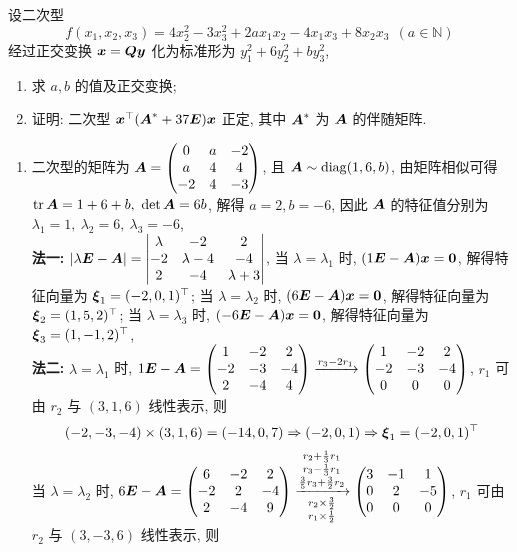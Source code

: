 \begin{example}
    设二次型 $$f(x_1,x_2,x_3)=4x_2^2-3x_3^2+2ax_1x_2-4x_1x_3+8x_2x_3~~(a\in\mathbb{N})$$
    经过正交变换 $\vb*{x}=\vb*{Qy}$ 化为标准形为 $y_1^2+6y_2^2+by_3^2$, 
    \begin{enumerate}[label=(\arabic{*})]
        \item 求 $a,b$ 的值及正交变换;
        \item 证明: 二次型 $\vb*{x}^\top\qty(\vb*{A}^*+37\vb*{E})\vb*{x}$ 正定, 其中 $\vb*{A}^*$ 为 $\vb*{A}$ 的伴随矩阵.
    \end{enumerate}
\end{example}
\begin{solution}
    \begin{enumerate}[label=(\arabic{*})]
        \item 二次型的矩阵为 $\vb*{A}=\mqty(0&a&-2\\a&4&4\\-2&4&-3)$, 且 $\vb*{A}\sim\mathrm{diag}(1,6,b)$, 由矩阵相似可得 $\tr\vb*{A}=1+6+b,~\det\vb*{A}=6b$, 解得 $a=2,b=-6$, 因此 $\vb*{A}$ 的特征值分别为 $\lambda_1=1,~\lambda_2=6,~\lambda_3=-6$, \\
              \textbf{法一: }$|\lambda\vb*{E}-\vb*{A}|=\mqty|\lambda&-2&2\\-2&\lambda-4&-4\\2&-4&\lambda+3|$, 当 $\lambda=\lambda_1$ 时, $\qty(1\vb*{E}-\vb*{A})\vb*{x}=\vb*{0}$, 解得特征向量为 $\vb*{\xi}_1=(-2,0,1)^\top$; 当 $\lambda=\lambda_2$ 时, 
              $(6\vb*{E}-\vb*{A})\vb*{x}=\vb*{0}$, 解得特征向量为 $\vb*{\xi}_2=(1,5,2)^\top$; 当 $\lambda=\lambda_3$ 时, $(-6\vb*{E}-\vb*{A})\vb*{x}=\vb*{0}$, 解得特征向量为 $\vb*{\xi}_3=(1,-1,2)^\top$, \\
              \textbf{法二: }$\lambda=\lambda_1$ 时, $1\vb*{E}-\vb*{A}=\mqty(1&-2&2\\-2&-3&-4\\2&-4&4)\xrightarrow{r_3-2r_1}\mqty(1&-2&2\\-2&-3&-4\\0&0&0)$, $r_1$ 可由 $r_2$ 与 $(3,1,6)$ 线性表示, 
              则 $$(-2,-3,-4)\times(3,1,6)=(-14,0,7)\Rightarrow (-2,0,1)\Rightarrow \vb*{\xi}_1=(-2,0,1)^\top$$
              当 $\lambda=\lambda_2$ 时, $6\vb*{E}-\vb*{A}=\mqty(6&-2&2\\-2&2&-4\\2&-4&9)\xrightarrow[\substack{r_2\times\frac{3}{2}\\r_1\times\frac{1}{2}}]{\substack{r_2+\frac{1}{3}r_1\\r_3-\frac{1}{3}r_1\\\frac{3}{5}r_3+\frac{3}{2}r_2}}\mqty(3&-1&1\\0&2&-5\\0&0&0)$, $r_1$ 可由 $r_2$ 与 $(3,-3,6)$ 线性表示, 则

\end{enumerate}
\end{solution}
